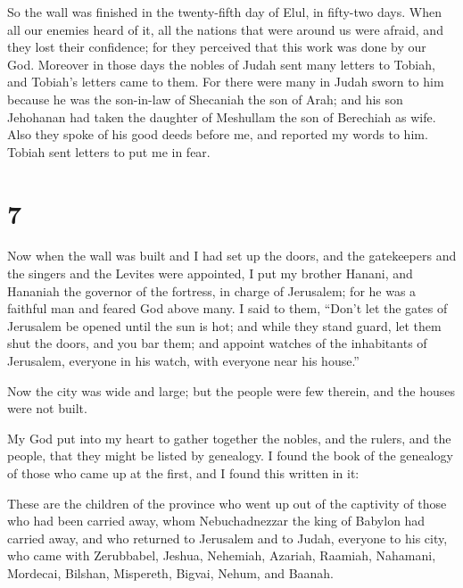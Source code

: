  So the wall was finished in the twenty-fifth day of Elul,
in fifty-two days.  When all our enemies heard of it, all
the nations that were around us were afraid, and they lost their
confidence; for they perceived that this work was done by our God.
 Moreover in those days the nobles of Judah sent many
letters to Tobiah, and Tobiah's letters came to them.  For
there were many in Judah sworn to him because he was the son-in-law of
Shecaniah the son of Arah; and his son Jehohanan had taken the daughter
of Meshullam the son of Berechiah as wife.  Also they spoke
of his good deeds before me, and reported my words to him. Tobiah sent
letters to put me in fear.

\hypertarget{section-6}{%
\section{7}\label{section-6}}

 Now when the wall was built and I had set up the doors, and
the gatekeepers and the singers and the Levites were appointed,
 I put my brother Hanani, and Hananiah the governor of the
fortress, in charge of Jerusalem; for he was a faithful man and feared
God above many.  I said to them, ``Don't let the gates of
Jerusalem be opened until the sun is hot; and while they stand guard,
let them shut the doors, and you bar them; and appoint watches of the
inhabitants of Jerusalem, everyone in his watch, with everyone near his
house.''

 Now the city was wide and large; but the people were few
therein, and the houses were not built.

 My God put into my heart to gather together the nobles, and
the rulers, and the people, that they might be listed by genealogy. I
found the book of the genealogy of those who came up at the first, and I
found this written in it:

 These are the children of the province who went up out of
the captivity of those who had been carried away, whom Nebuchadnezzar
the king of Babylon had carried away, and who returned to Jerusalem and
to Judah, everyone to his city,  who came with Zerubbabel,
Jeshua, Nehemiah, Azariah, Raamiah, Nahamani, Mordecai, Bilshan,
Mispereth, Bigvai, Nehum, and Baanah.

